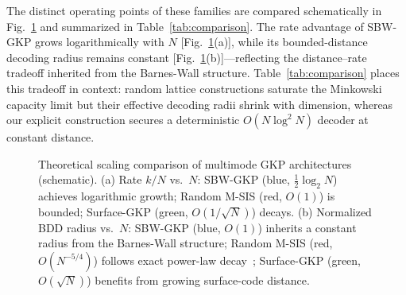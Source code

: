 \documentclass[aps,prl,twocolumn,superscriptaddress]{revtex4-2}
\begin{document}
The distinct operating points of these families are compared schematically in Fig.~\ref{fig:scaling} and summarized in Table~\ref{tab:comparison}. The rate advantage of SBW-GKP grows logarithmically with $N$ [Fig.~\ref{fig:scaling}(a)], while its bounded-distance decoding radius remains constant [Fig.~\ref{fig:scaling}(b)]---reflecting the distance--rate tradeoff inherited from the Barnes-Wall structure. Table~\ref{tab:comparison} places this tradeoff in context: random lattice constructions saturate the Minkowski capacity limit but their effective decoding radii shrink with dimension, whereas our explicit construction secures a deterministic $O(N\log^2 N)$ decoder at constant distance.


\begin{figure}[htbp]
\centering
{}
\caption{Theoretical scaling comparison of multimode GKP architectures (schematic). (a) Rate $k/N$ vs.\ $N$: SBW-GKP (blue, $\frac{1}{2}\log_2 N$) achieves logarithmic growth; Random M-SIS (red, $O(1)$) is bounded; Surface-GKP (green, $O(1/\sqrt{N})$) decays. (b) Normalized BDD radius vs.\ $N$: SBW-GKP (blue, $O(1)$) inherits a constant radius from the Barnes-Wall structure; Random M-SIS (red, $O(N^{-5/4})$) follows exact power-law decay~\cite{bloemer2026}; Surface-GKP (green, $O(\sqrt{N})$) benefits from growing surface-code distance.}
\label{fig:scaling}
\end{figure}
\end{document}
